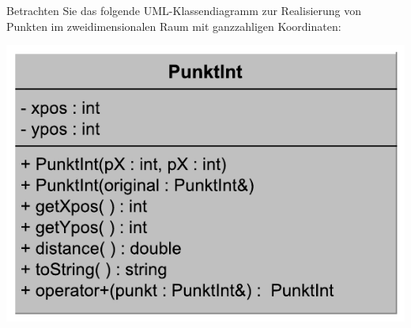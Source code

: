 \newcommand{\setfontsize}{11pt}

\lofoot{}


Betrachten Sie das folgende UML-Klassendiagramm zur Realisierung von Punkten im zweidimensionalen Raum mit ganzzahligen Koordinaten:
\begin{center}
	\includegraphics[keepaspectratio,scale=0.7]{punktint-uml.pdf}
\end{center}

